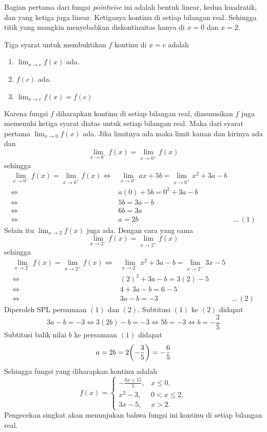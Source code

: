 \begin{enumerate}[leftmargin=*, label={\arabic*}.]
Bagian pertama dari fungsi \textit{pointwise} ini adalah bentuk linear, kedua kuadratik, 
dan yang ketiga juga linear. Ketiganya kontinu di setiap bilangan real. 
Sehingga titik yang mungkin menyebabkan diskontinuitas hanya di $x=0$ dan $x=2$.

Tiga syarat untuk membuktikan $f$ kontinu di $x=c$ adalah
    \begin{enumerate}[label={\arabic*}.]
    \item $\lim_{x\to c} f(x)$ ada.
    \item $f(c)$ ada.
    \item $\lim_{x\to c} f(x) = f(c)$
    \end{enumerate}
Karena fungsi $f$ diharapkan kontinu di setiap bilangan real, diasumsikan $f$ 
juga memenuhi ketiga syarat diatas untuk setiap bilangan real. Maka dari syarat pertama 
$\lim_{x\to 0} f(x)$ ada. Jika limitnya ada maka limit kanan dan kirinya ada dan 
\[
\lim_{x\to 0^{-}} f(x) = \lim_{x\to 0^{+}} f(x)
\]
sehingga
\begin{align*}
    \lim_{x\to 0^{-}} f(x) = \lim_{x\to 0^{+}} f(x)
    \iff &\lim_{x\to 0^{-}} ax+5b = \lim_{x\to 0^{+}} x^{2}+3a-b\\
    \iff &a(0)+5b = 0^{2}+3a-b\\
    \iff &5b = 3a-b\\
    \iff &6b = 3a\\
    \iff &a = 2b &...\,(1)
\end{align*}
Selain itu $\lim_{x\to 2} f(x)$ juga ada. Dengan cara yang sama
\[
\lim_{x\to 2^{-}} f(x) = \lim_{x\to 2^{+}} f(x)
\]
sehingga
\begin{align*}
    \lim_{x\to 2^{-}} f(x) = \lim_{x\to 2^{+}} f(x)
    \iff &\lim_{x\to 2^{-}} x^{2}+3a-b = \lim_{x\to 2^{+}} 3x-5\\
    \iff &(2)^{2}+3a-b = 3(2)-5\\
    \iff &4+3a-b= 6-5\\
    \iff &3a-b=-3 &...\,(2)
\end{align*}
Diperoleh SPL persamaan $(1)$ dan $(2)$. Subtitusi $(1)$ ke $(2)$ didapat
\[
3a-b= -3 \iff 3(2b)-b = -3 \iff 5b = -3 \iff b = -\frac{3}{5}
\]
Subtitusi balik nilai $b$ ke persamaan $(1)$ didapat
\[
a = 2b = 2\brk*{-\frac{3}{5}} = -\frac{6}{5}
\]
Sehingga fungsi yang diharapkan kontinu adalah 
\[
    f(x)=
    \begin{cases}
        -\frac{6x+15}{5}, &x \leq 0,\\
        x^2-3, &0 < x \leq 2,\\
        3x-5, &x > 2.
    \end{cases}
\]
Pengecekan singkat akan menunjukan bahwa fungsi ini kontinu di setiap bilangan 
real.


\end{enumerate}

